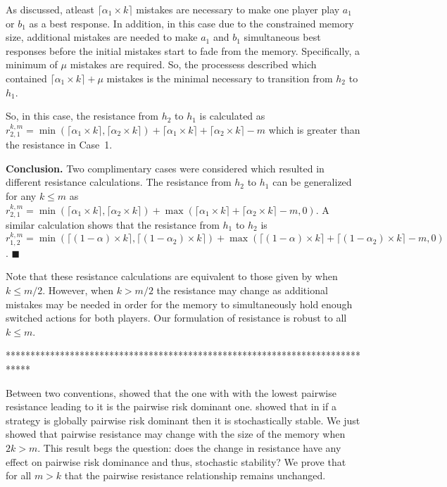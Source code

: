 \documentclass[11.5pt]{article}
\begin{document}
As discussed, atleast $\lceil \alpha_1 \times k \rceil$ mistakes are necessary to make one player play $a_1$ or $b_1$ as a best response. In addition, in this case due to the constrained memory size, additional mistakes are needed to make $a_1$ and $b_1$ simultaneous best responses before the initial mistakes start to fade from the memory. Specifically, a minimum of $\mu$ mistakes are required. So, the processess described which contained $\lceil \alpha_1 \times k \rceil + \mu$ mistakes is the minimal necessary to transition from $h_2$ to $h_1$.

So, in this case, the resistance from $h_2$ to $h_1$ is calculated as $r_{2,1}^{k,m} = \min(\lceil \alpha_1 \times k \rceil,\lceil \alpha_2 \times k \rceil)+\lceil \alpha_1 \times k \rceil+\lceil \alpha_2 \times k \rceil-m$ which is greater than the resistance in Case~1.

{\bf Conclusion.} Two complimentary cases were considered which resulted in different resistance calculations. The resistance from $h_2$ to $h_1$ can be generalized for any $k \leq m$ as $r^{k,m}_{2,1}=\min(\lceil \alpha_1 \times k \rceil,\lceil \alpha_2 \times k \rceil)+\max(\lceil \alpha_1 \times k \rceil+\lceil \alpha_2 \times k \rceil-m,0)$. A similar calculation shows that the resistance from $h_1$ to $h_2$ is $r^{k,m}_{1,2}=\min(\lceil (1-\alpha) \times k \rceil,\lceil (1-\alpha_2) \times  k \rceil)+\max(\lceil (1-\alpha) \times k \rceil+\lceil (1-\alpha_2) \times k \rceil-m,0)$.
$\blacksquare$

Note that these resistance calculations are equivalent to those given by \cite{Young1998} when $k \leq m/2$. However, when $k>m/2$ the resistance may change as additional mistakes may be needed in order for the memory to simultaneously hold enough switched actions for both players. Our formulation of resistance is robust to all $k \leq m$. 

*****************************************************************************

Between two conventions, \cite{Young1998} showed that the one with with the lowest pairwise resistance leading to it is the pairwise risk dominant one. \cite{maruta1997relationship} showed that in if a strategy is globally pairwise risk dominant then it is stochastically stable. We just showed that pairwise resistance may change with the size of the memory when $2k > m$.  This result begs the question: does the change in resistance have any effect on pairwise risk dominance and thus, stochastic stability? We prove that for all $m > k$ that the pairwise resistance relationship remains unchanged.
\end{document}
